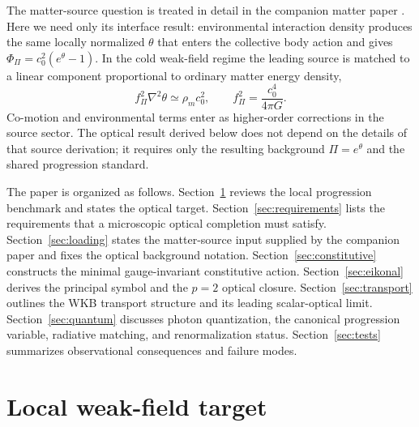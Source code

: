 \documentclass[12pt]{article}
\begin{document}
The matter-source question is treated in detail in the companion matter paper \cite{JordanMatterCompanion}.  Here we need only its interface result: environmental interaction density produces the same locally normalized \(\theta\) that enters the collective body action and gives \(\Phi_\Pi=c_0^2(e^\theta-1)\).  In the cold weak-field regime the leading source is matched to a linear component proportional to ordinary matter energy density,
\begin{equation}
    f_\Pi^2\nabla^2\theta\simeq \rho_m c_0^2,
    \qquad
    f_\Pi^2=\frac{c_0^4}{4\pi G} .
\label{eq:intro_matter_source_input}
\end{equation}
Co-motion and environmental terms enter as higher-order corrections in the source sector.  The optical result derived below does not depend on the details of that source derivation; it requires only the resulting background \(\Pi=e^\theta\) and the shared progression standard.

The paper is organized as follows.  Section~\ref{sec:benchmark} reviews the local progression benchmark and states the optical target.  Section~\ref{sec:requirements} lists the requirements that a microscopic optical completion must satisfy.  Section~\ref{sec:loading} states the matter-source input supplied by the companion paper and fixes the optical background notation.  Section~\ref{sec:constitutive} constructs the minimal gauge-invariant constitutive action.  Section~\ref{sec:eikonal} derives the principal symbol and the $p=2$ optical closure.  Section~\ref{sec:transport} outlines the WKB transport structure and its leading scalar-optical limit.  Section~\ref{sec:quantum} discusses photon quantization, the canonical progression variable, radiative matching, and renormalization status.  Section~\ref{sec:tests} summarizes observational consequences and failure modes.

\section{Local weak-field target}
\label{sec:benchmark}
\end{document}
